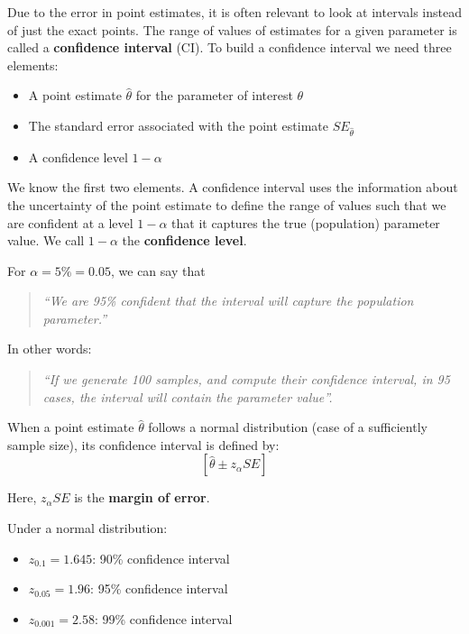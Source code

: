 \documentclass[
  letterpaper,
  DIV=11,
  numbers=noendperiod]{scrreprt}
\providecommand{\tightlist}{%
  \setlength{\itemsep}{0pt}\setlength{\parskip}{0pt}}\usepackage{longtable,booktabs,array}
\begin{document}
Due to the error in point estimates, it is often relevant to look at
intervals instead of just the exact points. The range of values of
estimates for a given parameter is called a \textbf{confidence interval}
(CI). To build a confidence interval we need three elements:

\begin{itemize}
\tightlist
\item
  A point estimate \(\hat{\theta}\) for the parameter of interest
  \(\theta\)
\item
  The standard error associated with the point estimate
  \(SE_{\hat{\theta}}\)
\item
  A confidence level \(1 - \alpha\)
\end{itemize}

We know the first two elements. A confidence interval uses the
information about the uncertainty of the point estimate to define the
range of values such that we are confident at a level \(1 - \alpha\)
that it captures the true (population) parameter value. We call
\(1 - \alpha\) the \textbf{confidence level}.

For \(\alpha = 5\% = 0.05\), we can say that

\begin{quote}
\emph{``We are 95\% confident that the interval will capture the
population parameter.''}
\end{quote}

In other words:

\begin{quote}
\emph{``If we generate 100 samples, and compute their confidence
interval, in 95 cases, the interval will contain the parameter value''.}
\end{quote}

When a point estimate \(\hat{\theta}\) follows a normal distribution
(case of a sufficiently sample size), its confidence interval is defined
by: \[[\hat{\theta} \pm z_\alpha SE]\]

Here, \(z_\alpha SE\) is the \textbf{margin of error}.

Under a normal distribution:

\begin{itemize}
\tightlist
\item
  \(z_{0.1} = 1.645\): 90\% confidence interval
\item
  \(z_{0.05} = 1.96\): 95\% confidence interval
\item
  \(z_{0.001} = 2.58\): 99\% confidence interval
\end{itemize}
\end{document}
